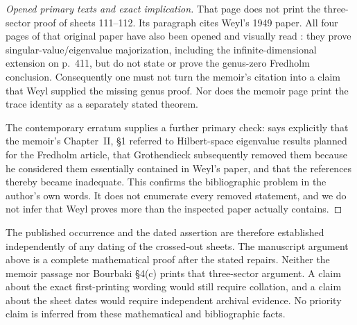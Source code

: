 \begin{proof}[Opened primary texts and exact implication]
That page does not print the three-sector proof of sheets 111--112. Its
paragraph cites Weyl's 1949 paper. All four pages of that original paper
have also been opened and visually read \cite{Weyl1949}: they prove
singular-value/eigenvalue majorization, including the infinite-dimensional
extension on p.~411, but do not state or prove the genus-zero Fredholm
conclusion. Consequently one must not turn the memoir's citation into a
claim that Weyl supplied the missing genus proof. Nor does the memoir page
print the trace identity as a separately stated theorem.

The contemporary erratum supplies a further primary check:
\cite[p.~119]{Grothendieck1956Erratum} says explicitly that the memoir's
Chapter~II, \S1 referred to Hilbert-space eigenvalue results planned for the
Fredholm article, that Grothendieck subsequently removed them because he
considered them essentially contained in Weyl's paper, and that the
references thereby became inadequate. This confirms the bibliographic
problem in the author's own words. It does not enumerate every removed
statement, and we do not infer that Weyl proves more than the inspected
paper actually contains.
\end{proof}

The published occurrence and the dated assertion are therefore established
independently of any dating of the crossed-out sheets. The manuscript
argument above is a complete mathematical proof after the stated repairs.
Neither the memoir passage nor Bourbaki \S4(c) prints that three-sector
argument. A claim about the exact first-printing wording would still
require collation, and a claim about the sheet dates would require
independent archival evidence. No priority claim is inferred from these
mathematical and bibliographic facts.

